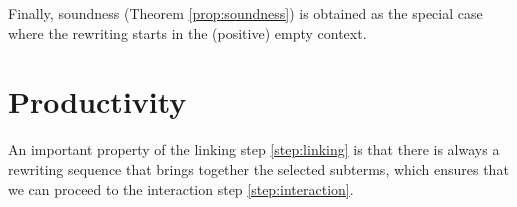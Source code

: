 Finally, soundness (Theorem \ref{prop:soundness}) is obtained as the special
case where the rewriting starts in the (positive) empty context.






\section{Productivity}

An important property of the linking step \ref{step:linking} is that there is
always a rewriting sequence that brings together the selected subterms, which
ensures that we can proceed to the interaction step \ref{step:interaction}.


